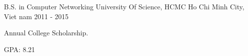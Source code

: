 

\begin{cventries}

  \cventry
    {B.S. in Computer Networking} %
    {University Of Science, HCMC} %
    {Ho Chi Minh City, Viet nam} %
    {2011 - 2015} %
    {
      \begin{cvitems} %
        \item {Annual College Scholarship.}
        \item {GPA: 8.21}
      \end{cvitems}
    }

\end{cventries}
